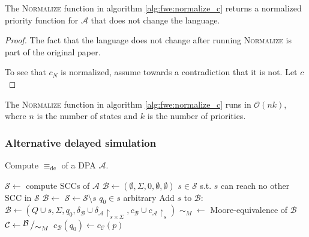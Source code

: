 \begin{lem}
	The \textsc{Normalize} function in algorithm \ref{alg:fwe:normalize_c} returns a normalized priority function for $\mathcal{A}$ that does not change the language.
\end{lem}

\begin{proof}
	The fact that the language does not change after running \textsc{Normalize} is part of the original paper.
	
	To see that $c_N$ is normalized, assume towards a contradiction that it is not. Let $c$
\end{proof}


\begin{lem}
	The \textsc{Normalize} function in algorithm \ref{alg:fwe:normalize_c} runs in $\mathcal{O}(nk)$, where $n$ is the number of states and $k$ is the number of priorities.
\end{lem}



\subsubsection{Alternative delayed simulation}

\begin{algorithm}
  \caption{Compute $\equiv_\text{de}$ of a DPA $\mathcal{A}$.}
  \label{alg:fwe:equiv_de_alt}
  \begin{algorithmic}[1]
      \State $\mathcal{S} \gets$ compute SCCs of $\mathcal{A}$
      \State $\mathcal{B} \gets (\emptyset, \Sigma, 0, \emptyset, \emptyset)$
        \State $s \in \mathcal{S}$ s.t. $s$ can reach no other SCC in $\mathcal{S}$
        \State $\mathcal{B} \gets$ 
        \State $\mathcal{S} \gets \mathcal{S} \setminus s$
      \EndWhile
      \State {}
    \EndFunction
    \Statex
      \State $q_0 \in s$ arbitrary
      \State Add $s$ to $\mathcal{B}$: $\mathcal{B} \gets (Q \cup s, \Sigma, q_0, \delta_\mathcal{B} \cup \delta_\mathcal{A}\upharpoonright_{s \times \Sigma}, c_\mathcal{B} \cup c_\mathcal{A}\upharpoonright_s)$
      \State $\sim_M \; \gets$ Moore-equivalence of $\mathcal{B}$
      \State $\mathcal{C} \gets \bigslant{\mathcal{B}}{\sim_M}$
          \State $c_\mathcal{B}(q_0) \gets c_\mathcal{C}(p)$
        \EndIf
      \EndIf
      \State {}
    \EndFunction
  \end{algorithmic}
\end{algorithm}


